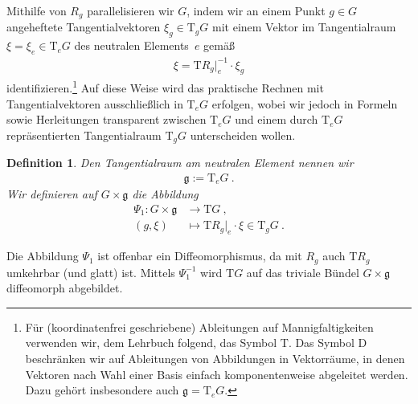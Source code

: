 \documentclass[10pt,a4paper]{article}
\theoremstyle{mytheorem}
\theoremstyle{mydefinition}
\newtheorem{definition}[theorem]{Definition}
\newcommand{\Dt}{\mathrm{D}}
\newcommand{\Tt}{\mathrm{T}}
\newcommand{\fg}{\mathfrak{g}}
\begin{document}
Mithilfe von $R_g$ parallelisieren wir $G$, 
indem wir an einem Punkt $g\in G$ angeheftete Tangentialvektoren $\xi_g\in\Tt_gG$ mit einem Vektor im Tangentialraum $\xi=\xi_e\in\Tt_eG$ des neutralen Elements~$e$ gemäß
\begin{align*}
	\xi = \Tt R_g|_e^{-1}\cdot\xi_g
\end{align*}
identifizieren.\footnote{
Für (koordinatenfrei geschriebene) Ableitungen auf Mannigfaltigkeiten verwenden wir, dem Lehrbuch \cite{StorchWiebe2005} folgend, das Symbol $\Tt$.
Das Symbol $\Dt$ beschränken wir auf Ableitungen von Abbildungen in Vektorräume, in denen Vektoren nach Wahl einer Basis einfach komponentenweise abgeleitet werden.
Dazu gehört insbesondere auch $\mathfrak{g}=\Tt_eG$.
}
Auf diese Weise wird das praktische Rechnen mit Tangentialvektoren  ausschließlich in $\Tt_eG$ erfolgen,
wobei wir jedoch in Formeln sowie Herleitungen transparent zwischen $\Tt_eG$ und einem durch $\Tt_eG$ repräsentierten Tangentialraum $\Tt_gG$ unterscheiden wollen.

\begin{definition}
\label{def:Psi1}
Den Tangentialraum am neutralen Element nennen wir
\begin{align*}
	\mathfrak{g} := \Tt_eG
	\ .
\end{align*}
Wir definieren auf $G\times\fg$ die Abbildung
\begin{align*}
	\Psi_1: G\times\fg 
	&\rightarrow\Tt G
	\ ,\nonumber\\
	(g, \xi)
	&\mapsto \Tt R_g|_e\cdot\xi
	\in \Tt_gG
	\ .
\end{align*}
\end{definition}

Die Abbildung $\Psi_1$ ist offenbar ein Diffeomorphismus, 
da mit $R_g$ auch $\Tt R_g$ umkehrbar (und glatt) ist.
Mittels $\Psi_1^{-1}$ wird $\Tt G$ auf das triviale Bündel $G\times\fg$ diffeomorph abgebildet.
\end{document}
